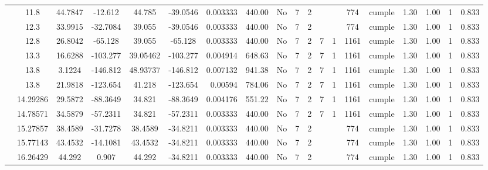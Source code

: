 \begin{table}[H]
{\begin{tabular}{|c|c|c|c|c|c|r|c|c|c|c|c|c|c|c|c|c|c|c|}
\cline{2-19}    & 11.8 & 44.7847 & -12.612 & 44.785 & -39.0546 & 0.003333 & 440.00 & No  & 7   & 2   &     &     & 774 & \cellcolor[rgb]{ .776,  .937,  .808}cumple & 1.30 & 1.00 & 1   & 0.833 \bigstrut\\
\cline{2-19}    & 12.3 & 33.9915 & -32.7084 & 39.055 & -39.0546 & 0.003333 & 440.00 & No  & 7   & 2   &     &     & 774 & \cellcolor[rgb]{ .776,  .937,  .808}cumple & 1.30 & 1.00 & 1   & 0.833 \bigstrut\\
\cline{2-19}    & 12.8 & 26.8042 & -65.128 & 39.055 & -65.128 & 0.003333 & 440.00 & No  & 7   & 2   & 7   & 1   & 1161 & \cellcolor[rgb]{ .776,  .937,  .808}cumple & 1.30 & 1.00 & 1   & 0.833 \bigstrut\\
\cline{2-19}    & 13.3 & 16.6288 & -103.277 & 39.05462 & -103.277 & 0.004914 & 648.63 & No  & 7   & 2   & 7   & 1   & 1161 & \cellcolor[rgb]{ .776,  .937,  .808}cumple & 1.30 & 1.00 & 1   & 0.833 \bigstrut\\
\cline{2-19}    & \cellcolor[rgb]{ .851,  .882,  .949}13.8 & 3.1224 & -146.812 & 48.93737 & -146.812 & 0.007132 & 941.38 & No  & 7   & 2   & 7   & 1   & 1161 & \cellcolor[rgb]{ .776,  .937,  .808}cumple & 1.30 & 1.00 & 1   & 0.833 \bigstrut\\
\cline{2-19}    & \cellcolor[rgb]{ .851,  .882,  .949}13.8 & 21.9818 & -123.654 & 41.218 & -123.654 & 0.00594 & 784.06 & No  & 7   & 2   & 7   & 1   & 1161 & \cellcolor[rgb]{ .776,  .937,  .808}cumple & 1.30 & 1.00 & 1   & 0.833 \bigstrut\\
\cline{2-19}    & 14.29286 & 29.5872 & -88.3649 & 34.821 & -88.3649 & 0.004176 & 551.22 & No  & 7   & 2   & 7   & 1   & 1161 & \cellcolor[rgb]{ .776,  .937,  .808}cumple & 1.30 & 1.00 & 1   & 0.833 \bigstrut\\
\cline{2-19}    & 14.78571 & 34.5879 & -57.2311 & 34.821 & -57.2311 & 0.003333 & 440.00 & No  & 7   & 2   & 7   & 1   & 1161 & \cellcolor[rgb]{ .776,  .937,  .808}cumple & 1.30 & 1.00 & 1   & 0.833 \bigstrut\\
\cline{2-19}    & 15.27857 & 38.4589 & -31.7278 & 38.4589 & -34.8211 & 0.003333 & 440.00 & No  & 7   & 2   &     &     & 774 & \cellcolor[rgb]{ .776,  .937,  .808}cumple & 1.30 & 1.00 & 1   & 0.833 \bigstrut\\
\cline{2-19}    & 15.77143 & 43.4532 & -14.1081 & 43.4532 & -34.8211 & 0.003333 & 440.00 & No  & 7   & 2   &     &     & 774 & \cellcolor[rgb]{ .776,  .937,  .808}cumple & 1.30 & 1.00 & 1   & 0.833 \bigstrut\\
\cline{2-19}    & 16.26429 & 44.292 & 0.907 & 44.292 & -34.8211 & 0.003333 & 440.00 & No  & 7   & 2   &     &     & 774 & \cellcolor[rgb]{ .776,  .937,  .808}cumple & 1.30 & 1.00 & 1   & 0.833 \bigstrut\\

\end{tabular}}
\end{table}

